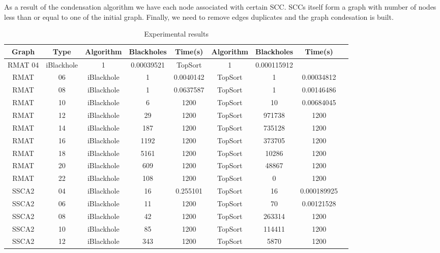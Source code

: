 As a result of the condensation algorithm we have each node associated with certain SCC.
SCCs itself form a graph with number of nodes less than or equal to one of the initial graph.
Finally, we need to remove edges duplicates and the graph condesation is built.

\begin{table}[]
	\caption{Experimental results}
	\label{tabular:tableresults}
	\begin{center}
		\begin{tabular}{c|c|c|c|c|c|c|c|c}
			Graph & Type & Algorithm & Blackholes & Time(s) & Algorithm & Blackholes & Time(s) \\
			\hline
			RMAT 04 & iBlackhole & 1 & 0.00039521 & TopSort & 1 & 0.000115912 \\
			RMAT & 06 & iBlackhole & 1 & 0.0040142 & TopSort & 1 & 0.00034812 \\
			RMAT & 08 & iBlackhole & 1 & 0.0637587 & TopSort & 1 & 0.00146486 \\
			RMAT & 10 & iBlackhole & 6 & 1200 & TopSort & 10 & 0.00684045 \\
			RMAT & 12 & iBlackhole & 29 & 1200 & TopSort & 971738 & 1200 \\
			RMAT & 14 & iBlackhole & 187 & 1200 & TopSort & 735128 & 1200 \\
			RMAT & 16 & iBlackhole & 1192 & 1200 & TopSort & 373705 & 1200 \\
			RMAT & 18 & iBlackhole & 5161 & 1200 & TopSort & 10286 & 1200 \\
			RMAT & 20 & iBlackhole & 609 & 1200 & TopSort & 48867 & 1200 \\
			RMAT & 22 & iBlackhole & 108 & 1200 & TopSort & 0 & 1200 \\
			SSCA2 & 04 & iBlackhole & 16 & 0.255101 & TopSort & 16 & 0.000189925 \\
			SSCA2 & 06 & iBlackhole & 11 & 1200 & TopSort & 70 & 0.00121528 \\
			SSCA2 & 08 & iBlackhole & 42 & 1200 & TopSort & 263314 & 1200 \\
			SSCA2 & 10 & iBlackhole & 85 & 1200 & TopSort & 114411 & 1200 \\
			SSCA2 & 12 & iBlackhole & 343 & 1200 & TopSort & 5870 & 1200 \\
		\end{tabular}
	\end{center}
\end{table}

